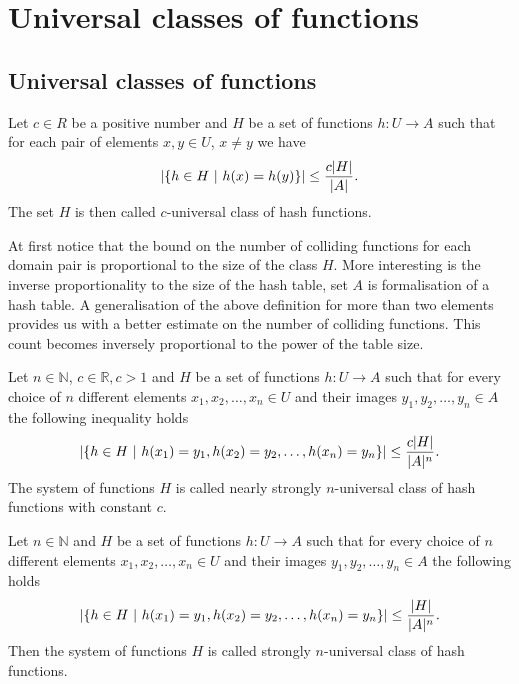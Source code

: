\chapter{Universal classes of functions}

\section{Universal classes of functions}

\begin{definition}
\label{c_universal_system}
Let $c \in R$ be a positive number and $H$ be a set of functions $h: U \rightarrow A$ such that for each pair of elements $x, y \in U$, $x \neq y$ we have \[ \left| \lbrace h \in H \ | \  h(x) = h(y) \rbrace \right| \leq \frac {c |H|}{|A|} \textit{.} \] The set $H$ is then called $c$-universal class of hash functions.
\end{definition}

At first notice that the bound on the number of colliding functions for each domain pair is proportional to the size of the class $H$. More interesting is the inverse proportionality to the size of the hash table, set $A$ is formalisation of a hash table. A generalisation of the above definition for more than two elements provides us with a better estimate on the number of colliding functions. This count becomes inversely proportional to the power of the table size.

\begin{definition}
\label{nearly_strong_universal_n_system}
Let $n \in \mathbb{N}$, $c \in \mathbb{R}, c > 1$ and $H$ be a set of functions $h: U \rightarrow A$ such that for every choice of $n$ different elements $x_1, x_2, \dots, x_n \in U$ and their images $y_1, y_2, \dots, y_n \in A$ the following inequality holds
\[ 
	\left|\lbrace h \in H \ | \  h(x_1) = y_1, h(x_2) = y_2, \dots, h(x_n) = y_n \rbrace \right| \leq \frac{c|H|}{|A|^n} \textit{.} 
\] 
The system of functions $H$ is called nearly strongly $n$-universal class of hash functions with constant $c$.
\end{definition}

\begin{definition}
\label{strong_universal_n_system}
Let $n \in \mathbb{N}$ and $H$ be a set of functions $h: U \rightarrow A$ such that for every choice of $n$ different elements $x_1, x_2, \dots, x_n \in U$ and their images $y_1, y_2, \dots, y_n \in A$ the following holds \[ \left|\lbrace h \in H \ | \  h(x_1) = y_1, h(x_2) = y_2, \dots, h(x_n) = y_n \rbrace \right| \leq \frac{|H|}{|A|^n} \textit{.} \] Then the system of functions $H$ is called strongly $n$-universal class of hash functions.
\end{definition}

